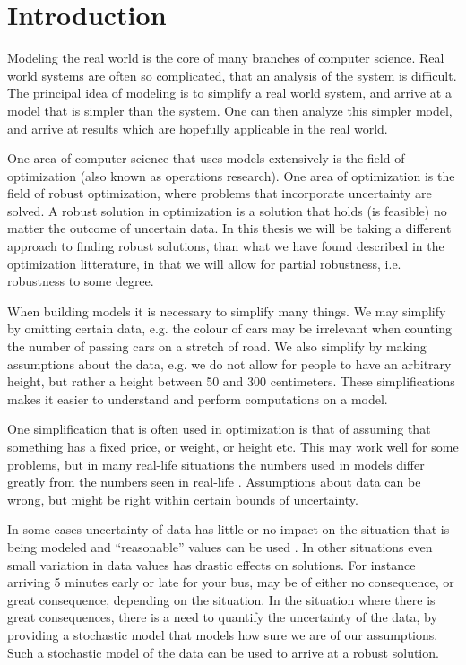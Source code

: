 \chapter{Introduction}
\label{sec:introduction}

Modeling the real world is the core of many branches of computer
science. Real world systems are often so complicated, that an analysis
of the system is difficult. The principal idea of modeling is to
simplify a real world system, and arrive at a model that is simpler
than the system. One can then analyze this simpler model, and arrive
at results which are hopefully applicable in the real world.

One area of computer science that uses models extensively is the field
of optimization (also known as operations research). One area of
optimization is the field of robust optimization, where problems that
incorporate uncertainty are solved. A robust solution in optimization is
a solution that holds (is feasible) no matter the outcome of uncertain
data. In this thesis we will be taking a different approach to finding
robust solutions, than what we have found described in the
optimization litterature, in that we will allow for partial
robustness, i.e. robustness to some degree.

When building models it is necessary to simplify many things. We may
simplify by omitting certain data, e.g. the colour of cars may be
irrelevant when counting the number of passing cars on a stretch of
road. We also simplify by making assumptions about the data, e.g. we
do not allow for people to have an arbitrary height, but rather a
height between 50 and 300 centimeters. These simplifications makes it
easier to understand and perform computations on a model. 

One simplification that is often used in optimization is that of
assuming that something has a fixed price, or weight, or height etc.
This may work well for some problems, but in many real-life situations
the numbers used in models differ greatly from the numbers seen in
real-life \cite{bental}. Assumptions about data can be wrong, but
might be right within certain bounds of uncertainty.

In some cases uncertainty of data has little or no impact on the
situation that is being modeled and ``reasonable'' values can be used
\cite{rockafellar}. In other situations even small variation in data
values has drastic effects on solutions. For instance arriving 5
minutes early or late for your bus, may be of either no consequence,
or great consequence, depending on the situation. In the situation
where there is great consequences, there is a need to quantify the
uncertainty of the data, by providing a stochastic model that models
how sure we are of our assumptions. Such a stochastic model of the
data can be used to arrive at a robust solution.

